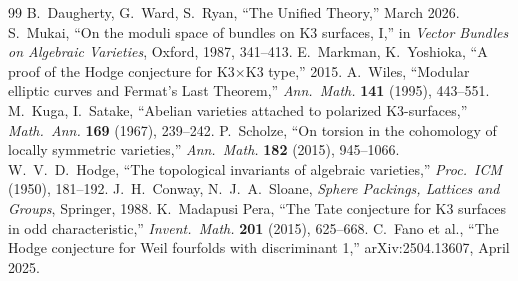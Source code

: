 \documentclass[12pt,a4paper]{article}
\begin{document}
\begin{thebibliography}{99}
 B.~Daugherty, G.~Ward, S.~Ryan, ``The Unified Theory,'' March 2026.
 S.~Mukai, ``On the moduli space of bundles on K3 surfaces, I,'' in \textit{Vector Bundles on Algebraic Varieties}, Oxford, 1987, 341--413.
 E.~Markman, K.~Yoshioka, ``A proof of the Hodge conjecture for K3$\times$K3 type,'' 2015.
 A.~Wiles, ``Modular elliptic curves and Fermat's Last Theorem,'' \textit{Ann.~Math.} \textbf{141} (1995), 443--551.
 M.~Kuga, I.~Satake, ``Abelian varieties attached to polarized K3-surfaces,'' \textit{Math.~Ann.} \textbf{169} (1967), 239--242.
 P.~Scholze, ``On torsion in the cohomology of locally symmetric varieties,'' \textit{Ann.~Math.} \textbf{182} (2015), 945--1066.
 W.~V.~D.~Hodge, ``The topological invariants of algebraic varieties,'' \textit{Proc.~ICM} (1950), 181--192.
 J.~H.~Conway, N.~J.~A.~Sloane, \textit{Sphere Packings, Lattices and Groups}, Springer, 1988.
 K.~Madapusi Pera, ``The Tate conjecture for K3 surfaces in odd characteristic,'' \textit{Invent.~Math.} \textbf{201} (2015), 625--668.
 C.~Fano et al., ``The Hodge conjecture for Weil fourfolds with discriminant 1,'' arXiv:2504.13607, April 2025.
\end{thebibliography}
\end{document}
